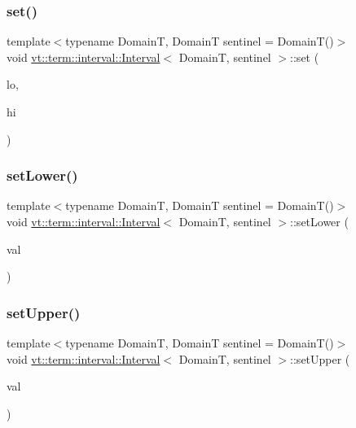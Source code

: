 \subsubsection{\texorpdfstring{set()}{set()}}
{\footnotesize\ttfamily template$<$typename DomainT, DomainT sentinel = Domain\+T()$>$ \\
void \hyperlink{structvt_1_1term_1_1interval_1_1_interval}{vt\+::term\+::interval\+::\+Interval}$<$ DomainT, sentinel $>$\+::set (\begin{DoxyParamCaption}\item[{DomainT const \&}]{lo,  }\item[{DomainT const \&}]{hi }\end{DoxyParamCaption})\hspace{0.3cm}{\ttfamily [inline]}}

\mbox{\label{structvt_1_1term_1_1interval_1_1_interval_a23bacd3eae47ae66f9cf22c1a2fa2567}} 
\subsubsection{\texorpdfstring{set\+Lower()}{setLower()}}
{\footnotesize\ttfamily template$<$typename DomainT, DomainT sentinel = Domain\+T()$>$ \\
void \hyperlink{structvt_1_1term_1_1interval_1_1_interval}{vt\+::term\+::interval\+::\+Interval}$<$ DomainT, sentinel $>$\+::set\+Lower (\begin{DoxyParamCaption}\item[{DomainT const \&}]{val }\end{DoxyParamCaption})\hspace{0.3cm}{\ttfamily [inline]}}

\mbox{\label{structvt_1_1term_1_1interval_1_1_interval_af77c4efbf790b76fcb92bb5db65299f5}} 
\subsubsection{\texorpdfstring{set\+Upper()}{setUpper()}}
{\footnotesize\ttfamily template$<$typename DomainT, DomainT sentinel = Domain\+T()$>$ \\
void \hyperlink{structvt_1_1term_1_1interval_1_1_interval}{vt\+::term\+::interval\+::\+Interval}$<$ DomainT, sentinel $>$\+::set\+Upper (\begin{DoxyParamCaption}\item[{DomainT const \&}]{val }\end{DoxyParamCaption})\hspace{0.3cm}{\ttfamily [inline]}}

